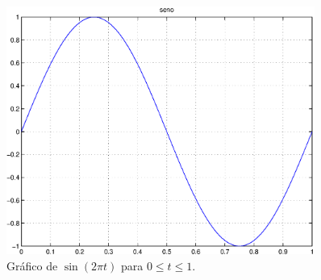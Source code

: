 \documentclass[11pt,twoside,a4paper]{report}
\begin{document}
\begin{figure}
  \centering
  \includegraphics[width=0.9\textwidth]{example_fig.eps}
  \caption{Gr\'afico de $\sin(2\pi t)$ para $0\leq t\leq 1$.}
  \label{f:seno}
\end{figure}
\end{document}
